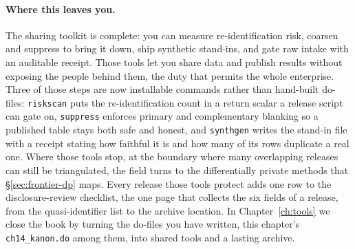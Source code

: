 \paragraph{Where this leaves you.} The sharing toolkit is complete: you can measure re-identification risk, coarsen and suppress to bring it down, ship synthetic stand-ins, and gate raw intake with an auditable receipt.  Those tools let you share data and publish results without exposing the people behind them, the duty that permits the whole enterprise. Three of those steps are now installable commands rather than hand-built do-files: \texttt{riskscan} puts the re-identification count in a return scalar a release script can gate on, \texttt{suppress} enforces primary and complementary blanking so a published table stays both safe and honest, and \texttt{synthgen} writes the stand-in file with a receipt stating how faithful it is and how many of its rows duplicate a real one. Where those tools stop, at the boundary where many overlapping releases can still be triangulated, the field turns to the differentially private methods that \S\ref{sec:frontier-dp} maps. Every release those tools protect adds one row to the disclosure-review checklist, the one page that collects the six fields of a release, from the quasi-identifier list to the archive location. In Chapter~\ref{ch:tools} we close the book by turning the do-files you have written, this chapter's \texttt{ch14\_kanon.do} among them, into shared tools and a lasting archive.

